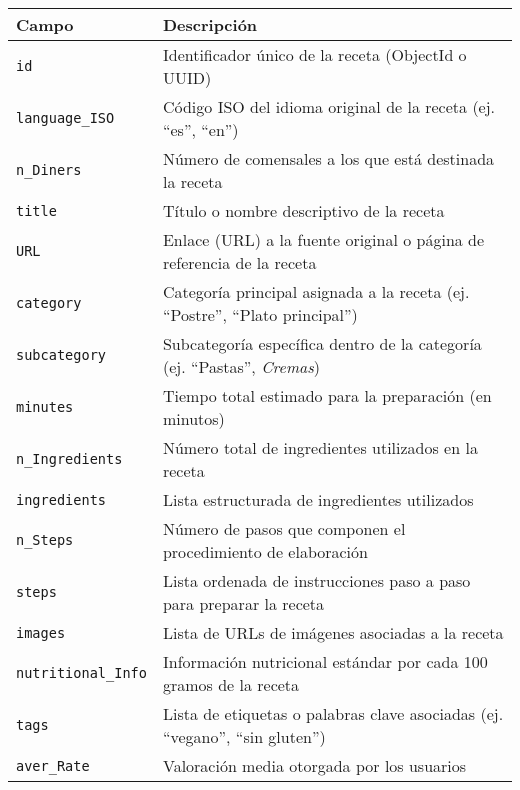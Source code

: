 \begin{table}
    \centering
    \begin{tabular}{|l|p{8cm}|}
        \hline
        \textbf{Campo} & \textbf{Descripción} \\
        \hline
        \texttt{id} & Identificador único de la receta (ObjectId o UUID) \\
        \hline
        \texttt{language\_ISO} & Código ISO del idioma original de la receta (ej. ``es'', ``en'') \\
        \hline
        \texttt{n\_Diners} & Número de comensales a los que está destinada la receta \\
        \hline
        \texttt{title} & Título o nombre descriptivo de la receta \\
        \hline
        \texttt{URL} & Enlace (URL) a la fuente original o página de referencia de la receta \\
        \hline
        \texttt{category} & Categoría principal asignada a la receta (ej. ``Postre'', ``Plato principal'') \\
        \hline
        \texttt{subcategory} & Subcategoría específica dentro de la categoría (ej. ``Pastas'', \textit{Cremas}) \\
        \hline
        \texttt{minutes} & Tiempo total estimado para la preparación (en minutos) \\
        \hline
        \texttt{n\_Ingredients} & Número total de ingredientes utilizados en la receta \\
        \hline
        \texttt{ingredients} & Lista estructurada de ingredientes utilizados \\
        \hline
        \texttt{n\_Steps} & Número de pasos que componen el procedimiento de elaboración \\
        \hline
        \texttt{steps} & Lista ordenada de instrucciones paso a paso para preparar la receta \\
        \hline
        \texttt{images} & Lista de URLs de imágenes asociadas a la receta \\
        \hline
        \texttt{nutritional\_Info} & Información nutricional estándar por cada 100 gramos de la receta \\
        \hline
        \texttt{tags} & Lista de etiquetas o palabras clave asociadas (ej. ``vegano'', ``sin gluten'') \\
        \hline
        \texttt{aver\_Rate} & Valoración media otorgada por los usuarios \\
        \hline

\end{tabular}
\end{table}
